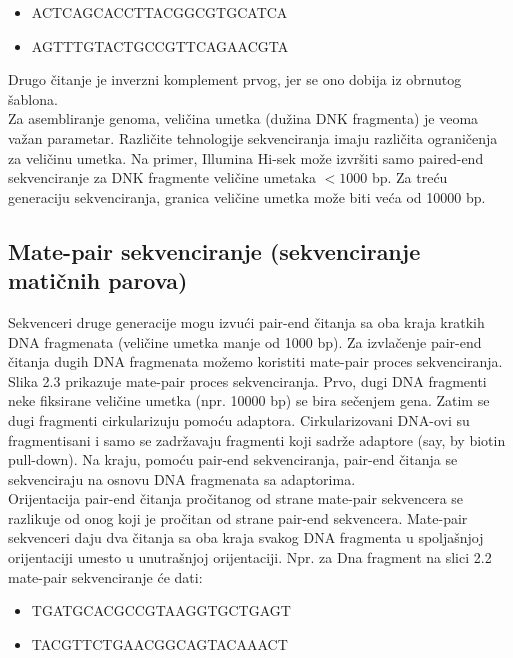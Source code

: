 \documentclass{article}
\begin{document}
\begin{itemize}
    \item {ACTCAGCACCTTACGGCGTGCATCA}
    \item {AGTTTGTACTGCCGTTCAGAACGTA}
\end{itemize}

Drugo čitanje je inverzni komplement prvog, jer se ono dobija iz obrnutog šablona.\\

Za asembliranje genoma, veličina umetka (dužina DNK fragmenta) je veoma važan parametar. Različite tehnologije sekvenciranja imaju različita ograničenja za veličinu umetka. Na primer, Illumina Hi-sek može izvršiti samo paired-end sekvenciranje za DNK fragmente veličine umetaka $< 1000$ bp. Za treću generaciju sekvenciranja, granica veličine umetka može biti veća od 10000 bp.\\


\subsection{Mate-pair sekvenciranje (sekvenciranje matičnih parova)}

Sekvenceri druge generacije mogu izvući pair-end čitanja sa oba kraja kratkih DNA fragmenata (veličine umetka manje od 1000 bp). Za izvlačenje pair-end čitanja dugih DNA fragmenata možemo koristiti mate-pair proces sekvenciranja. Slika 2.3 prikazuje mate-pair proces sekvenciranja.  Prvo, dugi DNA fragmenti neke fiksirane veličine umetka (npr. 10000 bp) se bira sečenjem gena. Zatim se dugi fragmenti cirkularizuju pomoću adaptora. Cirkularizovani DNA-ovi su fragmentisani i samo se zadržavaju fragmenti koji sadrže adaptore (say, by biotin pull-down). Na kraju, pomoću pair-end sekvenciranja, pair-end čitanja se sekvenciraju na osnovu DNA fragmenata sa adaptorima.\\

Orijentacija pair-end čitanja pročitanog od strane mate-pair sekvencera se razlikuje od onog koji je pročitan od strane pair-end sekvencera. Mate-pair sekvenceri daju dva čitanja sa oba kraja svakog DNA fragmenta u spoljašnjoj orijentaciji umesto u unutrašnjoj orijentaciji. Npr. za Dna fragment na slici 2.2 mate-pair sekvenciranje će dati:
\begin{itemize}
    \item {TGATGCACGCCGTAAGGTGCTGAGT}
    \item {TACGTTCTGAACGGCAGTACAAACT}
\end{itemize}
\end{document}
